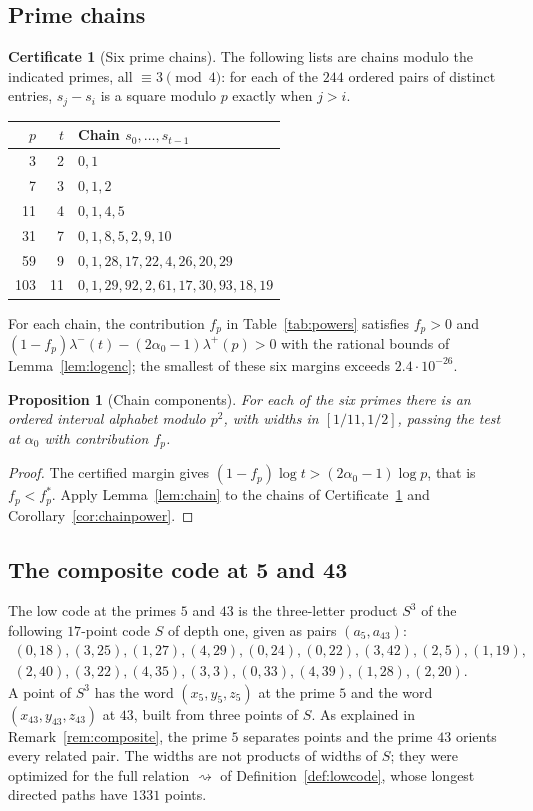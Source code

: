 \documentclass[11pt]{article}
\newtheorem{proposition}[theorem]{Proposition}
\theoremstyle{definition}
\newtheorem{certificate}[theorem]{Certificate}
\theoremstyle{remark}
\newcommand{\al}{\alpha_0}
\newcommand{\sto}{\rightsquigarrow}
\begin{document}
\subsection{Prime chains}
\begin{certificate}[Six prime chains]\label{cert:chains}
The following lists are chains modulo the indicated primes, all
$\equiv3\pmod4$: for each of the $244$ ordered pairs of distinct entries,
$s_j-s_i$ is a square modulo $p$ exactly when $j>i$.
\begin{center}
\begin{tabular}{rrl}\toprule
$p$&$t$&Chain $s_0,\ldots,s_{t-1}$\\\midrule
3&2&$0,1$\\
7&3&$0,1,2$\\
11&4&$0,1,4,5$\\
31&7&$0,1,8,5,2,9,10$\\
59&9&$0,1,28,17,22,4,26,20,29$\\
103&11&$0,1,29,92,2,61,17,30,93,18,19$\\\bottomrule
\end{tabular}
\end{center}
For each chain, the contribution $f_p$ in Table~\ref{tab:powers} satisfies
$f_p>0$ and $(1-f_p)\lambda^-(t)-(2\al-1)\lambda^+(p)>0$ with the rational
bounds of Lemma~\ref{lem:logenc}; the smallest of these six margins exceeds
$2.4\cdot10^{-26}$.
\end{certificate}

\begin{proposition}[Chain components]\label{prop:chains}
For each of the six primes there is an ordered interval alphabet modulo $p^2$,
with widths in $[1/11,1/2]$, passing the test at $\al$ with contribution
$f_p$.
\end{proposition}
\begin{proof}
The certified margin gives $(1-f_p)\log t>(2\al-1)\log p$, that is
$f_p<f_p^*$. Apply Lemma~\ref{lem:chain} to the chains of
Certificate~\ref{cert:chains} and Corollary~\ref{cor:chainpower}.
\end{proof}

\subsection{The composite code at 5 and 43}\label{subsec:odd215}
The low code at the primes $5$ and $43$ is the three-letter product $S^3$ of
the following $17$-point code $S$ of depth one, given as pairs
$(a_5,a_{43})$:
\[
\begin{gathered}
(0,18),(3,25),(1,27),(4,29),(0,24),(0,22),(3,42),(2,5),(1,19),\\
(2,40),(3,22),(4,35),(3,3),(0,33),(4,39),(1,28),(2,20).
\end{gathered}
\]
A point of $S^3$ has the word $(x_5,y_5,z_5)$ at the prime $5$ and the word
$(x_{43},y_{43},z_{43})$ at $43$, built from three points of $S$. As explained
in Remark~\ref{rem:composite}, the prime $5$ separates points and the prime
$43$ orients every related pair. The widths are not products of widths of
$S$; they were optimized for the full relation $\sto$ of
Definition~\ref{def:lowcode}, whose longest directed paths have $1331$
points.
\end{document}
